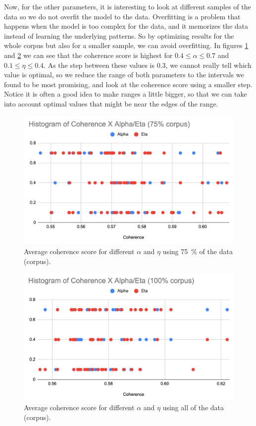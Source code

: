 \documentclass[conference, onecolumn]{IEEEtran}
\begin{document}
Now, for the other parameters, it is interesting to look at different samples of
the data so we do not overfit the model to the data.
Overfitting is a problem that happens when the model is too complex for the
data, and it memorizes the data instead of learning the underlying patterns.
So by optimizing results for the whole corpus but also for a smaller sample, we
can avoid overfitting.
In figures \cref{fig:75p-coherenceXalpha-eta} and
\cref{fig:100p-coherenceXalpha-eta} we can see that the coherence score is
highest for $0.4 \leqslant \alpha \leqslant 0.7$ and
$0.1 \leqslant \eta \leqslant 0.4$.
As the step between these values is $0.3$, we cannot really tell which value is
optimal, so we reduce the range of both parameters to the intervals we found to
be most promising, and look at the coherence score using a smaller step.
Notice it is often a good idea to make ranges a little bigger, so that we can
take into account optimal values that might be near the edges of the range.

\begin{figure}[H]
    \centering
    \includegraphics[width=0.7\linewidth]{75p-coherenceXalpha-eta.png}
    \caption{Average coherence score for different $\alpha$ and $\eta$ using
        \qty{75}{\percent} of the data (corpus).}
    \label{fig:75p-coherenceXalpha-eta}
\end{figure}

\begin{figure}[H]
    \centering
    \includegraphics[width=0.7\linewidth]{100p-coherenceXalpha-eta.png}
    \caption{Average coherence score for different $\alpha$ and $\eta$ using
        all of the data (corpus).}
    \label{fig:100p-coherenceXalpha-eta}
\end{figure}
\end{document}
